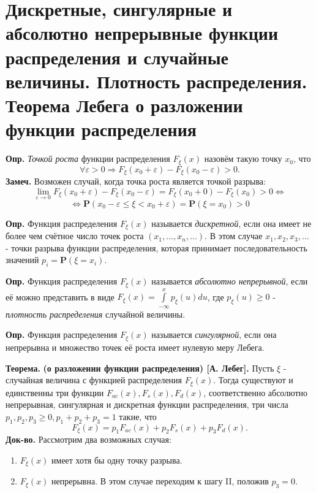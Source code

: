 \documentclass[oneside,final,14pt]{extreport}
\newcommand\mydef{{\bf Опр.}}
\newcommand\mynote{{\bf Замеч.}}
\newcommand\myth{{\bf Теорема.}}
\newcommand\myqed{{\bf Док-во.}}
\newcommand\myprob[1]{{\mathbf{P}(#1)}}
\theoremstyle{definition}
\begin{document}
\section{Дискретные, сингулярные и абсолютно непрерывные функции распределения и случайные величины. Плотность распределения. Теорема Лебега о разложении функции распределения}

\mydef{} {\it Точкой роста} функции распределения $F_\xi(x)$ назовём такую точку $x_0$, что 
$$ \forall \varepsilon > 0 \Rightarrow F_\xi(x_0 + \varepsilon) - F_\xi(x_0 - \varepsilon) > 0.$$
\mynote{} Возможен случай, когда точка роста является точкой разрыва:
$$\lim _{\varepsilon \rightarrow 0} F_{\xi}\left(x_{0}+\varepsilon\right)-F_{\xi}\left(x_{0}-\varepsilon\right)=F_{\xi}\left(x_{0}+0\right)-F_{\xi}\left(x_{0}\right)>0 \Longleftrightarrow $$ $$ \Longleftrightarrow \mathbf{P}\left(x_{0}-\varepsilon \leq \xi<x_{0}+\varepsilon\right)=\mathbf{P}\left(\xi=x_{0}\right)>0$$

\mydef{} Функция распределения $F_\xi(x)$ называется {\it дискретной}, если она имеет не более чем счётное число точек роста $(x_1, ..., x_n, ...).$ В этом случае $x_1, x_2, x_3, ...$ - точки разрыва функции распределения, которая принимает последовательность значений $p_i = \myprob{\xi = x_i}.$

\mydef{} Функция распределения $F_\xi(x)$ называется {\it абсолютно непрерывной}, если её можно представить в виде $F_{\xi}(x)=\int\limits_{-\infty}^{x} p_{\xi}(u)du$, где $p_\xi(u) \geq 0$ - {\it плотность распределения} случайной величины.

\mydef{} Функция распределения $F_\xi(x)$ называется {\it сингулярной}, если она непрерывна и множество точек её роста имеет нулевую меру Лебега.

\myth{} \textbf{(о разложении функции распределения) [А. Лебег].} 
Пусть $\xi$ - случайная величина с функцией распределения $F_\xi(x).$ Тогда существуют и единственны три функции $F_{ac}(x), F_s(x), F_d(x)$, соответственно абсолютно непрерывная, сингулярная и дискретная функции распределения, три числа $p_1, p_2, p_3 \geq 0, p_1 + p_2 + p_3 = 1$ такие, что 
$$F_{\xi}(x)=p_{1} F_{ac}(x)+p_{2} F_{s}(x)+p_{3} F_{d}(x).$$
\newpage
\myqed{} Рассмотрим два возможных случая:
\begin{enumerate}
    \item $F_\xi(x)$ имеет хотя бы одну точку разрыва.
    \item $F_\xi(x)$ непрерывна. В этом случае переходим к шагу II, положив $p_3 = 0$.
\end{enumerate}
\end{document}
